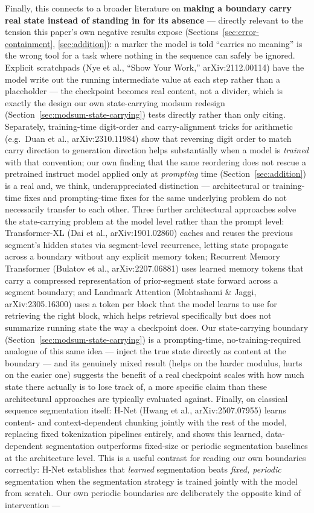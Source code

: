 \documentclass[11pt]{article}
\begin{document}
Finally, this connects to a broader literature on \textbf{making a boundary carry real state instead of standing in for its absence} --- directly relevant to the tension this paper's own negative results expose (Sections~\ref{sec:error-containment}, \ref{sec:addition}): a marker the model is told ``carries no meaning'' is the wrong tool for a task where nothing in the sequence can safely be ignored. Explicit scratchpads (Nye et al., ``Show Your Work,'' arXiv:2112.00114) have the model write out the running intermediate value at each step rather than a placeholder --- the checkpoint becomes real content, not a divider, which is exactly the design our own state-carrying modsum redesign (Section~\ref{sec:modsum-state-carrying}) tests directly rather than only citing. Separately, training-time digit-order and carry-alignment tricks for arithmetic (e.g.\ Duan et al., arXiv:2310.11984) show that reversing digit order to match carry direction to generation direction helps substantially when a model is \emph{trained} with that convention; our own finding that the same reordering does not rescue a pretrained instruct model applied only at \emph{prompting} time (Section~\ref{sec:addition}) is a real and, we think, underappreciated distinction --- architectural or training-time fixes and prompting-time fixes for the same underlying problem do not necessarily transfer to each other. Three further architectural approaches solve the state-carrying problem at the model level rather than the prompt level: Transformer-XL (Dai et al., arXiv:1901.02860) caches and reuses the previous segment's hidden states via segment-level recurrence, letting state propagate across a boundary without any explicit memory token; Recurrent Memory Transformer (Bulatov et al., arXiv:2207.06881) uses learned memory tokens that carry a compressed representation of prior-segment state forward across a segment boundary; and Landmark Attention (Mohtashami \& Jaggi, arXiv:2305.16300) uses a token per block that the model learns to use for retrieving the right block, which helps retrieval specifically but does not summarize running state the way a checkpoint does. Our state-carrying boundary (Section~\ref{sec:modsum-state-carrying}) is a prompting-time, no-training-required analogue of this same idea --- inject the true state directly as content at the boundary --- and its genuinely mixed result (helps on the harder modulus, hurts on the easier one) suggests the benefit of a real checkpoint scales with how much state there actually is to lose track of, a more specific claim than these architectural approaches are typically evaluated against. Finally, on classical sequence segmentation itself: H-Net (Hwang et al., arXiv:2507.07955) learns content- and context-dependent chunking jointly with the rest of the model, replacing fixed tokenization pipelines entirely, and shows this learned, data-dependent segmentation outperforms fixed-size or periodic segmentation baselines at the architecture level. This is a useful contrast for reading our own boundaries correctly: H-Net establishes that \emph{learned} segmentation beats \emph{fixed, periodic} segmentation when the segmentation strategy is trained jointly with the model from scratch. Our own periodic boundaries are deliberately the opposite kind of intervention --- 
\end{document}
